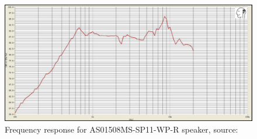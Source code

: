\documentclass[12pt, a4paper]{article}
\begin{document}
	\begin{figure}[!htb]
		\includegraphics[width=\textwidth]{./Figures/speaker_freq_response}
		\caption{Frequency response for AS01508MS-SP11-WP-R speaker, source: \cite{speakerDatasheet}}
		\label{fig:speakerFreq}
	\end{figure}
	\pagebreak
\end{document}
